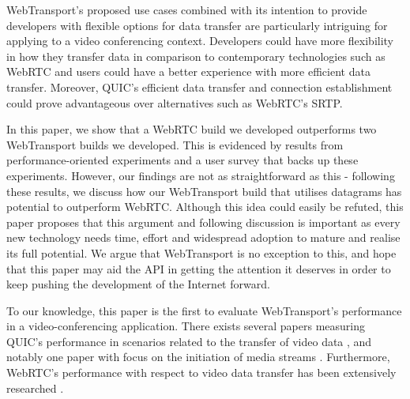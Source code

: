 WebTransport's proposed use cases combined with its intention to provide developers with flexible options for data transfer are particularly intriguing for applying to a video conferencing context. Developers could have more flexibility in how they transfer data in comparison to contemporary technologies such as WebRTC and users could have a better experience with more efficient data transfer. Moreover, QUIC's efficient data transfer and connection establishment could prove advantageous over alternatives such as WebRTC's SRTP.




In this paper, we show that a WebRTC build we developed outperforms two WebTransport builds we developed. This is evidenced by results from performance-oriented experiments and a user survey that backs up these experiments. However, our findings are not as straightforward as this - following these results, we discuss how our WebTransport build that utilises datagrams has potential to outperform WebRTC. Although this idea could easily be refuted, this paper proposes that this argument and following discussion is important as every new technology needs time, effort and widespread adoption to mature and realise its full potential. We argue that WebTransport is no exception to this, and hope that this paper may aid the API in getting the attention it deserves in order to keep pushing the development of the Internet forward.    



To our knowledge, this paper is the first to evaluate WebTransport's performance in a video-conferencing application.
There exists several papers measuring QUIC's performance in scenarios related to the transfer of video data \cite{bhat2017} \cite{shreedhar2021}, and notably one paper with focus on the initiation of media streams \cite{arisu2018}.
Furthermore, WebRTC's performance with respect to video data transfer has been extensively researched \cite{fund2013} \cite{jansen2018} \cite{singh2013} \cite{moulay2018}.

